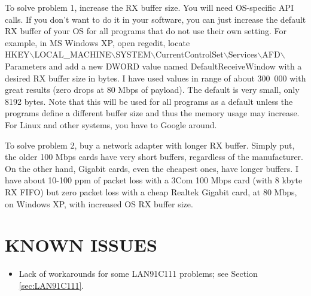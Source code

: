 \documentclass[a4paper,10pt,oneside,final]{article}
\begin{document}
To solve problem 1, increase the RX buffer size. You will need OS-specific
API calls. If you don't want to do it in your software, you can just increase
the default RX buffer of your OS for all programs that do not use their
own setting. For example, in MS Windows XP, open regedit, locate\\
HKEY$\backslash$LOCAL\_MACHINE$\backslash$SYSTEM$\backslash$CurrentControlSet$\backslash$Services$\backslash$AFD$\backslash$Parameters
and add a new DWORD value named DefaultReceiveWindow with a desired RX
buffer size in bytes. I have used values in range of about 300~000 with great 
results (zero drops at 80 Mbps of payload). The default is very small,
only 8192 bytes. Note that this will be used for all programs as a
default unless the programs define a different buffer size and thus
the memory usage may increase. For Linux and other systems, you have to Google around.

To solve problem 2, buy a network adapter with longer RX
buffer. Simply put, the older 100 Mbps cards have very short
buffers, regardless of the manufacturer. On the other hand, Gigabit
cards, even the cheapest ones, have longer buffers. I have about
10-100 ppm of packet loss with a 3Com 100 Mbps card (with 8 kbyte RX
FIFO) but zero packet loss with a cheap Realtek Gigabit card, at 80
Mbps, on Windows XP, with increased OS RX buffer size.

\newpage
\section{KNOWN ISSUES}

\begin{itemize}
\item Lack of workarounds for some LAN91C111 problems; see Section \ref{sec:LAN91C111}.
\end{itemize}
\end{document}
